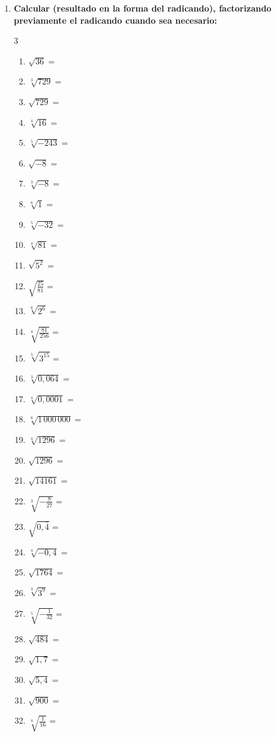 \documentclass[a4paper,12pt]{article}
\begin{document}
\begin{enumerate}[start=4]
    \item \textbf{Calcular (resultado en la forma del radicando), factorizando previamente el radicando cuando sea necesario:}
    \begin{multicols}{3}
    \begin{enumerate}[label=\arabic*)]
        \item $\sqrt{36} =$
        \item $\sqrt[3]{729} =$
        \item $\sqrt{729} =$
        \item $\sqrt[4]{16} =$
        \item $\sqrt[5]{-243} =$
        \item $\sqrt{-8} =$
        \item $\sqrt[3]{-8} =$
        \item $\sqrt[6]{1} =$
        \item $\sqrt[5]{-32} =$
        \item $\sqrt[4]{81} =$
        \item $\sqrt{5^2} =$
        \item $\sqrt{\frac{25}{81}} =$
        \item $\sqrt[6]{2^6} =$
        \item $\sqrt[4]{\frac{81}{256}} =$
        \item $\sqrt[5]{3^{15}} =$
        \item $\sqrt[3]{0,064} =$
        \item $\sqrt[4]{0,0001} =$
        \item $\sqrt[6]{1\,000\,000} =$
        \item $\sqrt[4]{1296} =$
        \item $\sqrt{1296} =$
        \item $\sqrt{14161} =$
        \item $\sqrt[3]{-\frac{8}{27}} =$
        \item $\sqrt{0,\bar{4}} =$
        \item $\sqrt[4]{-0,4} =$
        \item $\sqrt{1764} =$
        \item $\sqrt[3]{3^9} =$
        \item $\sqrt[5]{-\frac{1}{32}} =$
        \item $\sqrt{484} =$
        \item $\sqrt{1,7} =$
        \item $\sqrt{5,4} =$
        \item $\sqrt{900} =$
        \item $\sqrt[4]{\frac{1}{16}} =$

\end{enumerate}
\end{multicols}
\end{enumerate}
\end{document}

